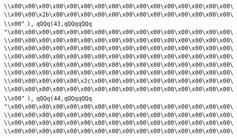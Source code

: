 \verb|\\x00\x00\x00\x00\x00\x00\x00\x00\x00\x00\x00\x00\x00\x00\x00\x00\|\newline
\verb|\\x00\x00\x2b\x00\x00\x00\x00\x00\x00\x00\x00\x00\x00\x00\x00\x00\|\newline
\verb|\\x00"|\newline
\verb|),|\newline
\verb|qQQq(43,qQQqqQQq|\newline
\verb|"\x00\x00\x00\x00\x00\x00\x00\x00\x00\x00\x00\x00\x00\x00\x00\x00\|\newline
\verb|\\x00\x00\x00\x00\x00\x00\x00\x00\x00\x00\x00\x00\x00\x00\x00\x00\|\newline
\verb|\\x00\x00\x00\x00\x00\x00\x00\x00\x00\x00\x00\x00\x00\x00\x00\x00\|\newline
\verb|\\x00\x00\x00\x00\x00\x00\x00\x00\x00\x00\x00\x00\x00\x00\x00\x00\|\newline
\verb|\\x00\x00\x00\x00\x00\x00\x00\x00\x00\x00\x00\x00\x00\x00\x00\x00\|\newline
\verb|\\x00\x00\x00\x00\x00\x00\x00\x00\x00\x00\x00\x00\x00\x00\x00\x00\|\newline
\verb|\\x00\x00\x00\x00\x00\x2c\x00\x00\x00\x00\x00\x00\x00\x00\x00\x00\|\newline
\verb|\\x00\x00\x00\x00\x00\x00\x00\x00\x00\x00\x00\x00\x00\x00\x00\x00\|\newline
\verb|\\x00"|\newline
\verb|),|\newline
\verb|qQQq(44,qQQqqQQq|\newline
\verb|"\x00\x00\x00\x00\x00\x00\x00\x00\x00\x00\x00\x00\x00\x00\x00\x00\|\newline
\verb|\\x00\x00\x00\x00\x00\x00\x00\x00\x00\x00\x00\x00\x00\x00\x00\x00\|\newline
\verb|\\x00\x00\x00\x00\x00\x00\x00\x00\x00\x00\x00\x00\x00\x00\x00\x00\|\newline
\verb|\\x00\x00\x00\x00\x00\x00\x00\x00\x00\x00\x00\x00\x00\x00\x00\x00\|\newline
